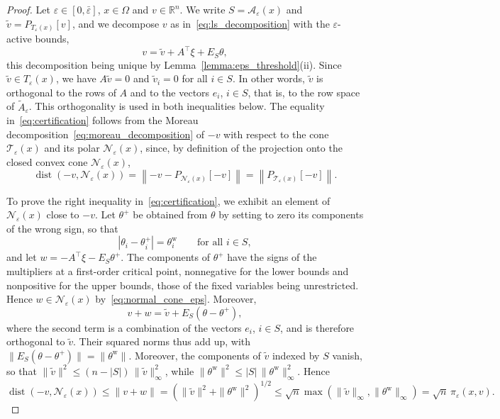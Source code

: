 \documentclass[pdflatex,sn-mathphys-num]{sn-jnl}%
\theoremstyle{thmstyleone}%
\newcommand{\RR}{{\mathbb{R}}} %
\newcommand{\calA}{{\mathcal{A}}}
\newcommand{\calN}{{\mathcal{N}}}
\newcommand{\calT}{{\mathcal{T}}}
\newcommand{\proj}[2]{P_{#1} \left[ {#2} \right]} %
\begin{document}
\begin{proof}
	Let $\varepsilon \in [0,\bar\varepsilon]$, $x \in \Omega$ and $v \in \RR^n$. We write $S = \calA_\varepsilon(x)$ and $\tilde{v} = \proj{T_\varepsilon(x)}{v}$, and we decompose $v$ as in~\eqref{eq:ls_decomposition} with the $\varepsilon$-active bounds,
	\[v = \tilde{v} + A^\top\xi + E_S\theta,\]
	this decomposition being unique by Lemma~\ref{lemma:eps_threshold}(ii). Since $\tilde{v} \in T_\varepsilon(x)$, we have $A\tilde{v} = 0$ and $\tilde{v}_i = 0$ for all $i \in S$. In other words, $\tilde{v}$ is orthogonal to the rows of $A$ and to the vectors $e_i$, $i \in S$, that is, to the row space of $\tilde{A}_\varepsilon$. This orthogonality is used in both inequalities below. The equality in~\eqref{eq:certification} follows from the Moreau decomposition~\eqref{eq:moreau_decomposition} of $-v$ with respect to the cone $\calT_\varepsilon(x)$ and its polar $\calN_\varepsilon(x)$, since, by definition of the projection onto the closed convex cone $\calN_\varepsilon(x)$,
	\[\operatorname{dist}\left(-v,\calN_\varepsilon(x)\right) = \left\|-v - \proj{\calN_\varepsilon(x)}{-v}\right\| = \left\|\proj{\calT_\varepsilon(x)}{-v}\right\|.\]

	To prove the right inequality in~\eqref{eq:certification}, we exhibit an element of $\calN_\varepsilon(x)$ close to $-v$. Let $\theta^+$ be obtained from $\theta$ by setting to zero its components of the wrong sign, so that
	\[|\theta_i - \theta^+_i| = \theta^{\mathrm{w}}_i \qquad \text{for all } i \in S,\]
	and let $w = -A^\top\xi - E_S\theta^+$. The components of $\theta^+$ have the signs of the multipliers at a first-order critical point, nonnegative for the lower bounds and nonpositive for the upper bounds, those of the fixed variables being unrestricted. Hence $w \in \calN_\varepsilon(x)$ by~\eqref{eq:normal_cone_eps}. Moreover,
	\[v + w = \tilde{v} + E_S(\theta-\theta^+),\]
	where the second term is a combination of the vectors $e_i$, $i \in S$, and is therefore orthogonal to $\tilde{v}$. Their squared norms thus add up, with $\|E_S(\theta-\theta^+)\| = \|\theta^{\mathrm{w}}\|$. Moreover, the components of $\tilde{v}$ indexed by $S$ vanish, so that $\|\tilde{v}\|^2 \le (n-|S|)\,\|\tilde{v}\|_\infty^2$, while $\|\theta^{\mathrm{w}}\|^2 \le |S|\,\|\theta^{\mathrm{w}}\|_\infty^2$. Hence
	\[\operatorname{dist}\left(-v,\calN_\varepsilon(x)\right) \le \|v+w\| = \left(\|\tilde{v}\|^2 + \|\theta^{\mathrm{w}}\|^2\right)^{1/2} \le \sqrt{n}\max\left(\|\tilde{v}\|_\infty,\|\theta^{\mathrm{w}}\|_\infty\right) = \sqrt{n}\,\pi_\varepsilon(x,v).\]


\end{proof}
\end{document}
